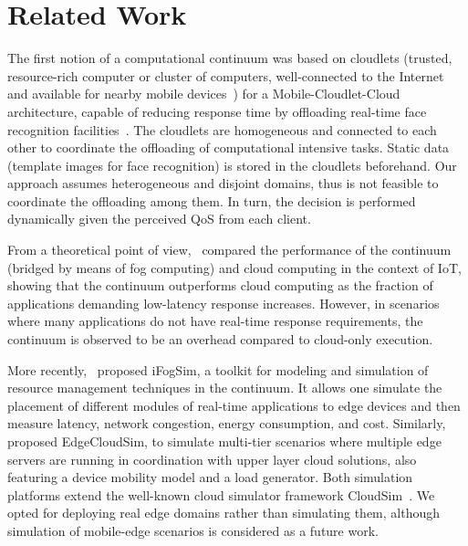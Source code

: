 \section{Related Work}
\label{sec:related}

The first notion of a computational continuum was based on cloudlets (trusted, resource-rich computer or cluster of computers, well-connected to the Internet and available for nearby mobile devices~\cite{Satyanarayanan09cloudlets}) for a Mobile-Cloudlet-Cloud architecture, capable of reducing response time by offloading real-time face recognition facilities~\cite{Soyata:2012}. The cloudlets are homogeneous and connected to each other to coordinate the offloading of computational intensive tasks. Static data (template images for face recognition) is stored in the cloudlets beforehand. Our approach assumes heterogeneous and disjoint domains, thus is not feasible to coordinate the offloading among them. In turn, the decision is performed dynamically given the perceived QoS from each client.

From a theoretical point of view,~\cite{sarkar2015assessment} compared the performance of the continuum (bridged by means of fog computing) and cloud computing in the context of IoT, showing that the continuum outperforms cloud computing as the fraction of applications demanding low-latency response increases. However, in scenarios where many applications do not have real-time response requirements, the continuum is observed to be an overhead compared to cloud-only execution.

More recently,~\cite{GuptaIfogSim17} proposed iFogSim, a toolkit for modeling and simulation of resource
management techniques in the continuum. It allows one simulate the placement of different modules of real-time applications to edge devices and then measure latency, network congestion, energy consumption, and cost. Similarly,~\cite{SonmezEgdeCloudSim17} proposed EdgeCloudSim, to simulate multi-tier scenarios where multiple edge servers are running in coordination with upper layer cloud solutions, also featuring a device mobility model and a load generator. Both simulation platforms extend the well-known cloud simulator framework CloudSim~\cite{calheiros2011cloudsim}. We opted for deploying real edge domains rather than simulating them, although simulation of mobile-edge scenarios is considered as a future work.

